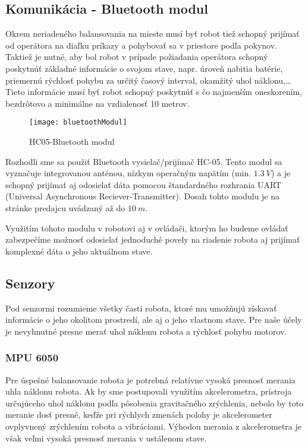 \subsection{Komunikácia - Bluetooth modul}
Okrem neriadeného balansovania na mieste musí byť robot tiež schopný prijímať od operátora na diaľku príkazy a pohybovať sa v priestore podľa pokynov. Taktiež je nutné, aby bol robot v prípade požiadania operátora schopný poskytnúť základné informácie o svojom stave, napr. úroveň nabitia batérie, priemernú rýchlosť pohybu za určitý časový interval, okamžitý uhol náklonu,… Tieto informácie musí byť robot schopný poskytnúť s čo najmenším oneskorením, bezdrôtovo a minimálne na vzdialenosť 10 metrov.  
\begin{figure}[h!]
\centering
\texttt{[image: bluetoothModul]}
\caption{HC05-Bluetooth modul\cite{bluetoothModule}}
\label{fig:bluetoothModul}
\end{figure}
Rozhodli sme sa použiť Bluetooth vysielač/prijímač HC-05. Tento modul sa vyznačuje integrovanou anténou, nízkym operačným napätím (min. $1.3~V$) a je schopný prijímať aj odosielať dáta pomocou štandardného rozhrania \ac{UART} (Universal Asynchronous Reciever-Transmitter). Dosah tohto modulu je na stránke predajcu uvádzaný až do $10~m$.

Využitím tohoto modulu v robotovi aj v ovládači, ktorým ho budeme ovládať zabezpečíme možnosť odosielať jednoduché povely na riadenie robota aj prijímať komplexné dáta o jeho aktuálnom stave.

\subsection{Senzory}
Pod senzormi rozumieme všetky časti robota, ktoré mu umožňujú získavať informácie o jeho okolitom prostredí, ale aj o jeho vlastnom stave. Pre naše účely je nevyhnutné presne merať uhol náklonu robota a rýchlosť pohybu motorov.

\subsubsection{MPU 6050}
Pre úspešné balansovanie robota je potrebná relatívne vysoká presnosť merania uhla náklonu robota. Ak by sme postupovali využitím akcelerometra, prístroja určujúceho uhol náklonu podľa pôsobenia gravitačného zrýchlenia, nebolo by toto meranie dosť presné, keďže pri rýchlych zmenách polohy je akcelerometer ovplyvnený zrýchlením robota a vibráciami. Výhodou merania z akcelerometra je však veľmi vysoká presnosť merania v ustálenom stave. 

